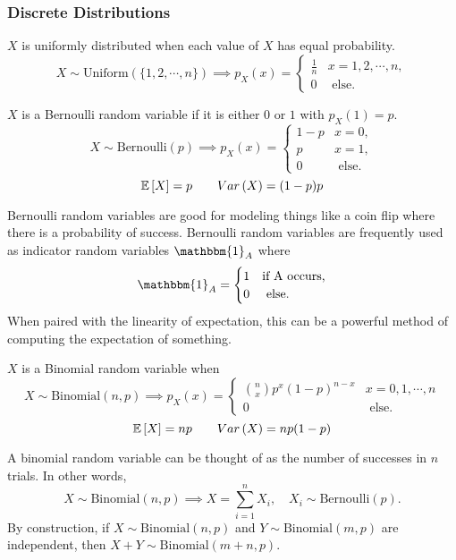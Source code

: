 \subsubsection{Discrete Distributions}
\begin{definition}
  $X$ is uniformly distributed when each value of $X$ has equal probability.
  \[
	X\sim \text{Uniform}(\{ 1, 2, \cdots, n \}) \implies p_X(x)  = \begin{cases}
	  \frac{1}{n} & x = 1, 2, \cdots, n,\\
	  0 & \text{ else.}
	\end{cases}
  \]
  \label{defn:drv-uniform}
\end{definition}
\begin{definition}
  $X$ is a Bernoulli random variable if it is either $0$ or $1$ with $p_X(1) = p$.
  \[
	X\sim\text{Bernoulli}(p) \implies p_X(x) = \begin{cases}
	  1 - p & x=0,\\
	  p & x=1,\\
	  0 & \text{ else.}
	\end{cases}
  \]
  \[
	\mathbb{E}\left[X\right] = p \qquad Var\left(X\right) = (1-p)p
  \]
  \label{defn:bernoulli}
\end{definition}
Bernoulli random variables are good for modeling things like a coin flip where there is a probability of success.
Bernoulli random variables are frequently used as indicator random variables $\mathbbm{1}_A$ where
\[
  \mathbbm{1}_A = \begin{cases}
	1 & \text{if A occurs,}\\
	0 & \text{ else.}
  \end{cases}
\]
When paired with the linearity of expectation, this can be a powerful method of computing the expectation of something.
\begin{definition}
  $X$ is a Binomial random variable when
  \[
	X \sim \text{Binomial}(n, p) \implies p_X(x) = \begin{cases}
	\binom{n}{x} p^x (1-p)^{n-x} & x=0, 1, \cdots, n\\
	  0 & \text{ else.}
	\end{cases}
  \]
  \[
	\mathbb{E}\left[X\right] = np \qquad Var\left(X\right) = np(1-p)
  \]
  \label{defn:binomial}
\end{definition}
A binomial random variable can be thought of as the number of successes in $n$ trials. 
In other words, 
\[
  X \sim \text{Binomial}(n, p) \implies X = \sum_{i=1}^{n}X_i, \quad X_i \sim \text{Bernoulli}(p).
\]
By construction, if $X\sim\text{Binomial}(n, p)$ and $Y\sim\text{Binomial}(m, p)$ are independent, then $X+Y \sim \text{Binomial}(m+n, p)$.
